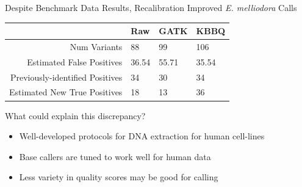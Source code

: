 \documentclass[table]{beamer}
\begin{document}
\begin{frame}{Despite Benchmark Data Results, Recalibration Improved \textit{E. melliodora} Calls}
\begin{tabular}{r l l l}
&Raw& GATK& KBBQ\\
\hline
Num Variants&88&99&106\\
Estimated False Positives&36.54&55.71&35.54\\
Previously-identified Positives&34&30&34\\
\hline
\hline
Estimated New True Positives&18&13&36\\
\end{tabular}
\end{frame}

\begin{frame}{What could explain this discrepancy?}
\begin{itemize}
\item Well-developed protocols for DNA extraction for human cell-lines
\item Base callers are tuned to work well for human data
\item Less variety in quality scores may be good for calling
\end{itemize}
\end{frame}
\end{document}
